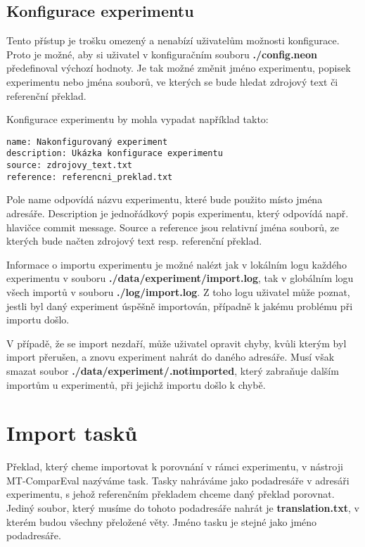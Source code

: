 \subsection{Konfigurace experimentu}
Tento přístup je trošku omezený a nenabízí uživatelům možnosti konfigurace.
Proto je možné,
  aby si uživatel v konfiguračním souboru \textbf{./config.neon} předefinoval výchozí hodnoty.
Je tak možné změnit jméno experimentu, popisek experimentu nebo jména souborů,
  ve kterých se bude hledat zdrojový text či referenční překlad.

Konfigurace experimentu by mohla vypadat například takto: \\

\begin{verbatim}
name: Nakonfigurovaný experiment
description: Ukázka konfigurace experimentu
source: zdrojovy_text.txt
reference: referencni_preklad.txt
\end{verbatim}

Pole name odpovídá názvu experimentu, které bude použito místo jména adresáře.
Description je jednořádkový popis experimentu,
  který odpovídá např. hlavičce commit message.
Source a reference jsou relativní jména souborů,
  ze kterých bude načten zdrojový text resp. referenční překlad.

Informace o importu experimentu je možné nalézt
  jak v lokálním logu každého experimentu v souboru \textbf{./data/experiment/import.log},
  tak v globálním logu všech importů v souboru \textbf{./log/import.log}.
Z toho logu uživatel může poznat,
  jestli byl daný experiment úspěšně importován,
  případně k jakému problému při importu došlo.

V případě, že se import nezdaří,
  může uživatel opravit chyby,
  kvůli kterým byl import přerušen,
  a znovu experiment nahrát do daného adresáře.
Musí však smazat soubor \textbf{./data/experiment/.notimported},
  který zabraňuje dalším importům u experimentů,
  při jejichž importu došlo k chybě.


\section{Import tasků}
Překlad,
  který cheme importovat k porovnání v rámci experimentu,
  v nástroji MT-ComparEval nazýváme task.
Tasky nahráváme jako podadresáře v adresáři experimentu,
  s jehož referenčním překladem chceme daný překlad porovnat.
Jediný soubor, který musíme do tohoto podadresáře nahrát je \textbf{translation.txt},
  v kterém budou všechny přeložené věty.
Jméno tasku je stejné jako jméno podadresáře.

